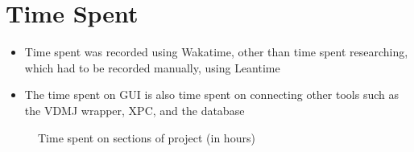\documentclass[../dissertation.tex]{subfiles}
\begin{document}
\section{Time Spent}
\begin{itemize}
  \item Time spent was recorded using Wakatime, other than time spent
    researching, which had to be recorded manually, using Leantime
  \item The time spent on GUI is also time spent on connecting other tools
    such as the VDMJ wrapper, XPC, and the database
\end{itemize}
\begin{figure}[!htp]
  \centering
  \caption{Time spent on sections of project (in hours)}
\end{figure}
\end{document}
